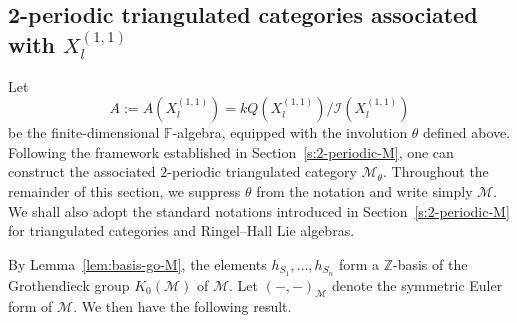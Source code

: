 \documentclass[12pt,reqno]{amsart}
\numberwithin{equation}{section}
\renewcommand{\mod}{\operatorname{mod}\nolimits}
\newcommand{\id}{\operatorname{id}\nolimits}
\newcommand{\go}{{K_0}}
\begin{document}
	
	\subsection{2-periodic triangulated categories associated with $X_{l}^{(1,1)}$}
	Let
	\[A:=A(X_l^{(1,1)})
	=
	kQ(X_l^{(1,1)})/\mathcal{I}(X_l^{(1,1)})\]
	be the finite-dimensional $\mathbb{F}$-algebra, equipped with the
	involution $\theta$ defined above. Following the framework established in Section~\ref{s:2-periodic-M}, one can construct the associated $2$-periodic triangulated category $\mathcal{M}_{\theta}$. Throughout the remainder of this section, we suppress $\theta$ from the notation and write simply $\mathcal{M}$. We shall also adopt the standard notations introduced in Section~\ref{s:2-periodic-M} for triangulated categories and Ringel–Hall Lie algebras.
	
	
	
	By Lemma~\ref{lem:basis-go-M}, the elements
	$h_{S_1},\ldots,h_{S_n}$
	form a $\mathbb{Z}$-basis of the Grothendieck group
	$\go(\mathcal{M})$ of $\mathcal{M}$. Let
	$(-,-)_{\mathcal{M}}$ denote the symmetric Euler form of
	$\mathcal{M}$. We then have the following result.
	
	
	
	
	
\end{document}
